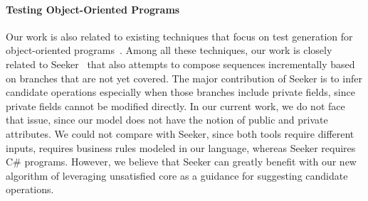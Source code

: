 \paragraph*{Testing Object-Oriented Programs} Our work is also related to existing techniques that focus on test 
generation for object-oriented programs~\cite{pacheco2007,tillmann2008,thummalapenta2011, tonella:etoc}. 
Among all these techniques, our work is closely related to Seeker~\cite{thummalapenta2011}
that also attempts to compose sequences incrementally based on branches that
are not yet covered. The major contribution of Seeker is to infer
candidate operations especially when those branches include private fields,
since private fields cannot be modified directly. In our current work,
we do not face that issue, since our model does not have the notion of public
and private attributes. We could not compare \tool{} with Seeker, since
both tools require different inputs, \tool{} requires business rules modeled in
our language, whereas Seeker requires C\# programs. However, we believe that Seeker can greatly benefit with
our new algorithm of leveraging unsatisfied core as a guidance for suggesting
candidate operations.

